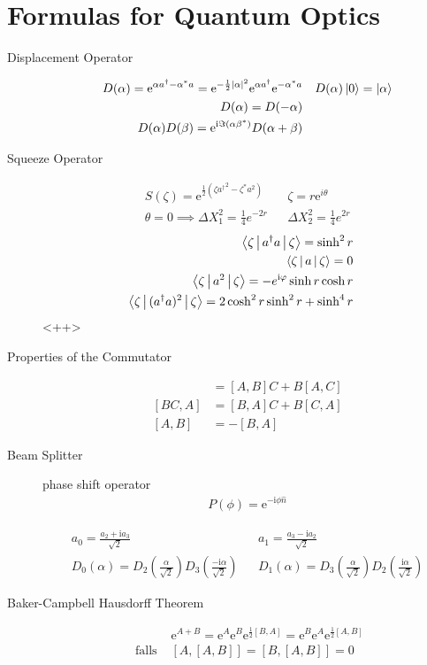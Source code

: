 \documentclass[twocolumn, 11pt]{article}
\renewcommand{\i}{\mathrm{i}}
\newcommand{\e}{\mathrm{e}}
\newcommand{\abs}[1]{\left| #1 \right|}
\begin{document}
%
\section*{Formulas for Quantum Optics}
\begin{description}
  \item[Displacement Operator]
\begin{align*}
  D(\alpha) = \e^{\alpha a^{\dagger} - \alpha ^{\ast} a} = \e^{- \frac{1}{2} \abs{\alpha}^2} \e^{\alpha a ^{\dagger}} \e^{- \alpha ^{\ast} a} && D(\alpha) \Ket{0} = \Ket{\alpha} \\
  D(\alpha) = D(-\alpha) \\
  D(\alpha) D(\beta) = \e^{\i \Im (\alpha \beta^{\ast})} D(\alpha + \beta)
\end{align*}
%
\item [Squeeze Operator] 
\begin{align*}
  S(\zeta) = \e^{\frac{1}{2} (\zeta {a^{\dagger}}^2 - \zeta^{\ast} a^2)} &&
 \zeta = r \e^{i \theta} \\
  \theta = 0 \implies \Delta X_1 ^2 = \frac{1}{4} e^{-2 r} &&  \Delta X_2 ^2 = \frac{1}{4} e^{2 r}
\end{align*}
%
%
\begin{align*}
  \Braket{\zeta | a ^{\dagger} a | \zeta} = \sinh^2 r && \\
  \Braket{\zeta | a | \zeta} = 0 && \\
  \Braket{\zeta | a^2 | \zeta} = -e ^{\i \varphi} \sinh r \cosh r && \\
  \Braket{\zeta | (a^{\dagger} a )^2 | \zeta} = 2 \cosh^2 r \sinh^2 r + \sinh^4 r
\end{align*}
%
<++>
\item[Properties of the Commutator] 
%
\begin{align*}
  [A, BC] &= [A, B] C + B [A, C] \\
  [BC, A] &= [B, A] C + B [C, A] \\
  [A, B] &= - [B, A]
\end{align*}
%
\item [Beam Splitter]
phase shift operator
%
\begin{align*}
  P(\phi) = \e^{- \i \phi \hat{n}}
\end{align*}
%

\begin{align*}
  a_0 = \frac{a_2 + \i a_3}{\sqrt{2}} && a_1 = \frac{a_3 - \i a_2}{\sqrt{2}} \\
  D_0(\alpha) = D_2(\frac{\alpha}{\sqrt{2}}) D_3(\frac{- \i \alpha}{\sqrt{2}}) &&
  D_1(\alpha) = D_3(\frac{\alpha}{\sqrt{2}}) D_2(\frac{\i \alpha}{\sqrt{2}})
\end{align*}
%
%
\item[Baker-Campbell Hausdorff Theorem] 
\begin{align*}
  & \e^{A + B}  = \e^A \e^B \e^{\frac{1}{2} [B, A]} = \e^B \e^A \e^{\frac{1}{2} [A, B]} \\
  \text{ falls } & [A, [A, B]] = [B, [A, B]] = 0
\end{align*}
%
  

\end{description}
\end{document}
